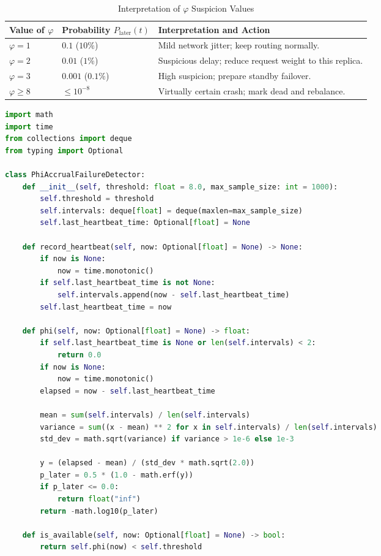 \begin{table}[htbp]
\centering\small
\begin{tabular}{llp{7.5cm}}
\toprule
\textbf{Value of $\varphi$} & \textbf{Probability $P_{\text{later}}(t)$} & \textbf{Interpretation and Action} \\
\midrule
$\varphi = 1$ & $0.1$ ($10\%$) & Mild network jitter; keep routing normally. \\
$\varphi = 2$ & $0.01$ ($1\%$) & Suspicious delay; reduce request weight to this replica. \\
$\varphi = 3$ & $0.001$ ($0.1\%$) & High suspicion; prepare standby failover. \\
$\varphi \ge 8$ & $\le 10^{-8}$ & Virtually certain crash; mark dead and rebalance. \\
\bottomrule
\end{tabular}
\caption{Interpretation of $\varphi$ Suspicion Values}
\label{tab:v4-ch09-phi}
\end{table}

\begin{lstlisting}[language=Python, caption={Runnable $\varphi$-Accrual Failure Detector in Python}]
import math
import time
from collections import deque
from typing import Optional

class PhiAccrualFailureDetector:
    def __init__(self, threshold: float = 8.0, max_sample_size: int = 1000):
        self.threshold = threshold
        self.intervals: deque[float] = deque(maxlen=max_sample_size)
        self.last_heartbeat_time: Optional[float] = None

    def record_heartbeat(self, now: Optional[float] = None) -> None:
        if now is None:
            now = time.monotonic()
        if self.last_heartbeat_time is not None:
            self.intervals.append(now - self.last_heartbeat_time)
        self.last_heartbeat_time = now

    def phi(self, now: Optional[float] = None) -> float:
        if self.last_heartbeat_time is None or len(self.intervals) < 2:
            return 0.0
        if now is None:
            now = time.monotonic()
        elapsed = now - self.last_heartbeat_time

        mean = sum(self.intervals) / len(self.intervals)
        variance = sum((x - mean) ** 2 for x in self.intervals) / len(self.intervals)
        std_dev = math.sqrt(variance) if variance > 1e-6 else 1e-3

        y = (elapsed - mean) / (std_dev * math.sqrt(2.0))
        p_later = 0.5 * (1.0 - math.erf(y))
        if p_later <= 0.0:
            return float("inf")
        return -math.log10(p_later)

    def is_available(self, now: Optional[float] = None) -> bool:
        return self.phi(now) < self.threshold
\end{lstlisting}

